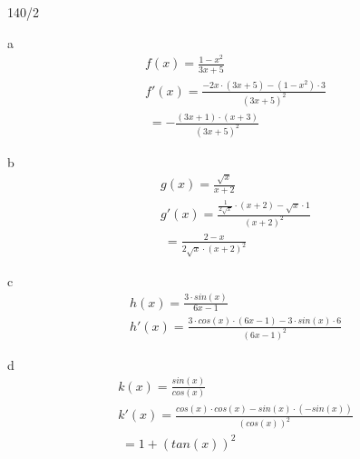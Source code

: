 \begin{exercise}{140/2}
  \item [a]
  \begin{gather*}
    f(x) = \frac{1 - x^2}{3x + 5} \\
    f'(x) = \frac{-2x \cdot (3x + 5) - (1 - x^2) \cdot 3}{(3x + 5)^2} \\
    \;= -\frac{(3x + 1) \cdot (x + 3)}{(3x + 5)^2}
  \end{gather*}
  \item [b]
  \begin{gather*}
    g(x) = \frac{\sqrt{x}}{x + 2} \\
    g'(x) = \frac{\frac{1}{2\sqrt{x}} \cdot (x + 2) - \sqrt{x} \cdot 1}{(x + 2)^2} \\
    \;= \frac{2 - x}{2\sqrt{x} \cdot (x + 2)^2}
  \end{gather*}
  \item [c]
  \begin{gather*}
    h(x) = \frac{3 \cdot sin(x)}{6x - 1} \\
    h'(x) = \frac{3 \cdot cos(x) \cdot (6x - 1) - 3 \cdot sin(x) \cdot 6}{(6x - 1)^2}
  \end{gather*}
  \item [d]
  \begin{gather*}
    k(x) = \frac{sin(x)}{cos(x)} \\
    k'(x) = \frac{cos(x) \cdot cos(x) - sin(x) \cdot (-sin(x))}{(cos(x))^2} \\
    \;= 1 + (tan(x))^2
  \end{gather*}
\end{exercise}
